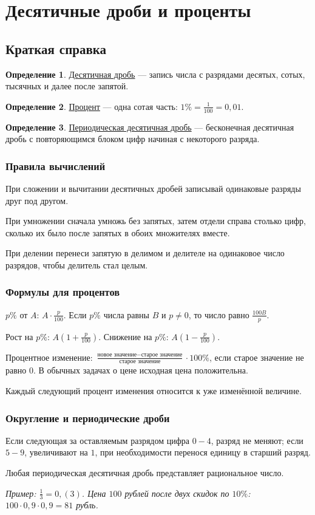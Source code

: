 \documentclass[12pt,a4paper]{article}
\theoremstyle{definition}
\newtheorem{definition}{Определение}[section]
\theoremstyle{plain}
\theoremstyle{remark}
\newcommand{\term}[1]{\uline{#1}}
\begin{document}
\section{Десятичные дроби и проценты}
\subsection*{Краткая справка}
\begin{definition}\term{Десятичная дробь} — запись числа с разрядами десятых, сотых, тысячных и далее после запятой.\end{definition}
\begin{definition}\term{Процент} — одна сотая часть: \(1 \% = \frac{1}{100} = 0{,}01\).\end{definition}
\begin{definition}\term{Периодическая десятичная дробь} — бесконечная десятичная дробь с повторяющимся блоком цифр начиная с некоторого разряда.\end{definition}
\subsubsection*{Правила вычислений}
При сложении и вычитании десятичных дробей записывай одинаковые разряды друг под другом.\par
При умножении сначала умножь без запятых, затем отдели справа столько цифр, сколько их было после запятых в обоих множителях вместе.\par
При делении перенеси запятую в делимом и делителе на одинаковое число разрядов, чтобы делитель стал целым.\par
\subsubsection*{Формулы для процентов}
\(p \%\) от \(A\): \(A \cdot \frac{p}{100}\). Если \(p \%\) числа равны \(B\) и \(p \ne  0\), то число равно \(\frac{100 B}{p}\).\par
Рост на \(p \%\): \(A (1 + \frac{p}{100})\). Снижение на \(p \%\): \(A (1 - \frac{p}{100})\).\par
Процентное изменение: \(\frac{\text{новое значение} - \text{старое значение}}{\text{старое значение}} \cdot 100 \%\), если старое значение не равно \(0\). В обычных задачах о цене исходная цена положительна.\par
Каждый следующий процент изменения относится к уже изменённой величине.\par
\subsubsection*{Округление и периодические дроби}
Если следующая за оставляемым разрядом цифра \(0 - 4\), разряд не меняют; если \(5 - 9\), увеличивают на \(1\), при необходимости перенося единицу в старший разряд.\par
Любая периодическая десятичная дробь представляет рациональное число.\par
{\small\textit{Пример: \(\frac{1}{3} = 0{,}(3)\). Цена \(100\) рублей после двух скидок по \(10 \%\): \(100 \cdot 0{,}9 \cdot 0{,}9 = 81\) рубль.}}\par
\end{document}
